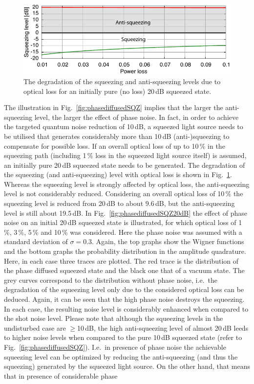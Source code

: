 \begin{figure}
\centering
\includegraphics[scale=1]{./Sec_Optics/SQZ-20dB-losschartAI.pdf}
\caption{The degradation of the squeezing and anti-squeezing levels due to optical loss for an initially pure (no loss) 20\,dB squeezed state.}
\label{fig:20dBlosschart}
\end{figure}

The illustration in Fig.~\ref{fig:phasediffusedSQZ} implies that the larger the anti-squeezing level, the larger the effect of phase noise. In fact, in order to achieve the targeted quantum noise reduction of 10\,dB, a squeezed light source needs to be utilised that generates considerably more than 10\,dB (anti-)squeezing to compensate for possible loss. If an overall optical loss of up to 10\,\% in the squeezing path (including 1\,\% loss in the squeezed light source itself) is assumed, an initially pure 20\,dB squeezed state needs to be generated. The degradation of the squeezing (and anti-squeezing) level with optical loss is shown in Fig.~\ref{fig:20dBlosschart}. Whereas the squeezing level is strongly affected by optical loss, the anti-squeezing level is not considerably reduced. Considering an overall optical loss of 10\,\% the squeezing level is reduced from 20\,dB to about 9.6\,dB, but the anti-squeezing level is still about 19.5\,dB. In Fig.~\ref{fig:phasediffusedSQZ20dB} the effect of phase noise on an initial 20\,dB squeezed state is illustrated, for which optical loss of 1\,\%, 3\,\%, 5\,\% and 10\,\% was considered. Here the phase noise was assumed with a standard deviation of $\sigma=0.3$. Again,  the top graphs show the Wigner functions and the bottom graphs the probability distribution in the amplitude quadrature. Here, in each case three traces are plotted. The red trace is the distribution of the phase diffused squeezed state and the black one that of a vacuum state. The grey curves correspond to the distribution without phase noise, i.e.\ the degradation of the squeezing level only due to the considered optical loss can be deduced. Again, it can be seen that the high phase noise destroys the squeezing. In each case, the resulting noise level is considerably enhanced when compared to the shot noise level. Please note that although the squeezing levels in the undisturbed case are $\geq$10\,dB, the high anti-squeezing level of almost 20\,dB leeds to higher noise levels when compared to the pure 10\,dB squeezed state (refer to Fig.~\ref{fig:phasediffusedSQZ}). I.e.\ in presence of phase noise the achievable squeezing level can be  optimized by reducing the anti-squeezing (and thus the squeezing) generated by the squeezed light source. On the other hand, that means that in presence of considerable phase 